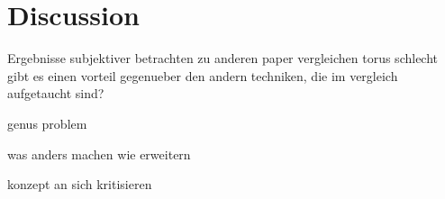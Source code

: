 \chapter{Discussion}
\label{sec:dicussion}

Ergebnisse subjektiver betrachten
zu anderen paper vergleichen
torus schlecht
gibt es einen vorteil gegenueber den andern techniken, die im vergleich aufgetaucht sind?

genus problem

was anders machen
wie erweitern

konzept an sich kritisieren
